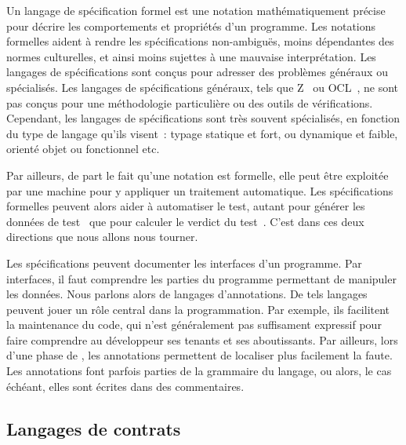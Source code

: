 Un {\strong langage de spécification} formel est une notation mathématiquement
précise pour décrire les comportements et propriétés d'un programme. Les
{\strong notations formelles} aident à rendre les spécifications non-ambiguës,
moins dépendantes des normes culturelles, et ainsi moins sujettes à une mauvaise
interprétation. Les langages de spécifications sont conçus pour adresser des
problèmes généraux ou spécialisés. Les langages de spécifications généraux, tels
que Z~ ou OCL~, ne sont pas conçus pour une
méthodologie particulière ou des outils de vérifications. Cependant, les
langages de spécifications sont très souvent spécialisés, en fonction du type de
langage qu'ils visent~: typage statique et fort, ou dynamique et faible, orienté
objet ou fonctionnel etc.

Par ailleurs, de part le fait qu'une notation est formelle, elle peut être
exploitée par une machine pour y appliquer un traitement automatique.  Les
spécifications formelles peuvent alors aider à {\strong automatiser le test},
autant pour générer les données de test~ que pour calculer le verdict du test~.  C'est dans ces
deux directions que nous allons nous tourner.

Les spécifications peuvent documenter les {\strong interfaces} d'un programme.
Par interfaces, il faut comprendre les parties du programme permettant de
manipuler les données. Nous parlons alors de {\strong langages d'annotations}.
De tels langages peuvent jouer un rôle central dans la programmation. Par
exemple, ils facilitent la maintenance du code, qui n'est généralement pas
suffisament expressif pour faire comprendre au développeur ses tenants et ses
aboutissants. Par ailleurs, lors d'une phase de , les
annotations permettent de localiser plus facilement la faute. Les annotations
font parfois parties de la grammaire du langage, ou alors, le cas échéant, elles
sont écrites dans des {\strong commentaires}.

\subsection{Langages de contrats}
\label{subsection:sota:dbc}

